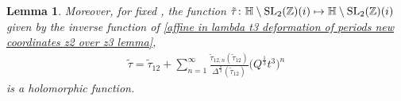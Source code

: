\documentclass[11pt]{article}
\numberwithin{equation}{section}
\numberwithin{equation}{section}
\newtheorem{Lemma}[Theorem]{Lemma}
\begin{document}
\begin{Lemma}
Moreover, for fixed , the function
$
\tilde\tau\colon \mathbb{H}\setminus{ {\rm SL}_2(\mathbb{Z})(i) } \mapsto \mathbb{H}\setminus{{\rm SL}_2(\mathbb{Z})(i)}
$
given by the inverse function of \eqref{affine in lambda t3 deformation of periods new coordinates z2 over z3 lemma},
\begin{gather}\label{affine in lambda t3 deformation of periods new coordinates z2 over z3 inverse lemma}
\tilde\tau=\tilde\tau_{12}+\sum_{n=1}^{\infty}\frac{\tilde\tau_{12,n}(\tilde\tau_{12})}{\Delta^{\frac{n}{3}}(\tilde\tau_{12})} \bigl( Q^{\frac{1}{3}}t^3\bigr)^n
\end{gather}
is a holomorphic function.



 \end{Lemma}
\end{document}
